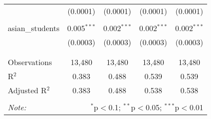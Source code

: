 \begin{table}[!htbp]
\begin{tabular}{@{\extracolsep{-2pt}}lcccc}
  & (0.0001) & (0.0001) & (0.0001) & (0.0001) \\ 
  & & & & \\ 
 asian\_students & 0.005$^{***}$ & 0.002$^{***}$ & 0.002$^{***}$ & 0.002$^{***}$ \\ 
  & (0.0003) & (0.0003) & (0.0003) & (0.0003) \\ 
  & & & & \\ 
\hline \\[-1.8ex] 
Observations & 13,480 & 13,480 & 13,480 & 13,480 \\ 
R$^{2}$ & 0.383 & 0.488 & 0.539 & 0.539 \\ 
Adjusted R$^{2}$ & 0.383 & 0.488 & 0.538 & 0.538 \\ 
\hline 
\hline \\[-1.8ex] 
\textit{Note:}  & \multicolumn{4}{r}{$^{*}$p$<$0.1; $^{**}$p$<$0.05; $^{***}$p$<$0.01} \\ 
\end{tabular} 
\end{table} 
